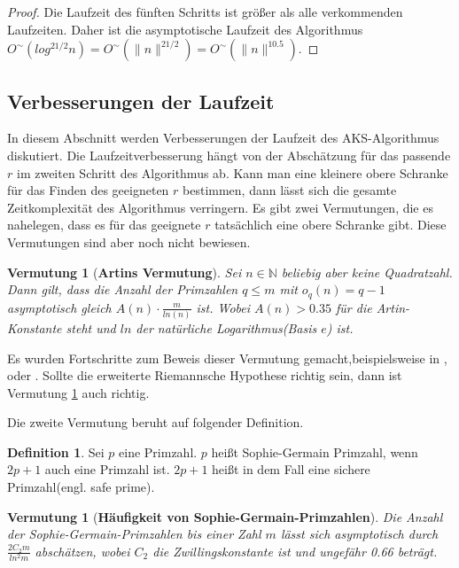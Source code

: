 \documentclass[12pt,oneside]{article}
\newtheorem{conj}[theorem]{Vermutung}
\theoremstyle{remark}
\theoremstyle{definition}
\newtheorem{definition}{Definition}[section]
\begin{document}
\begin{proof}
Die Laufzeit des fünften Schritts ist größer als alle verkommenden Laufzeiten. Daher ist die asymptotische Laufzeit des Algorithmus $O^{\sim}(log^{21/2}n) = O^{\sim}( \lVert n \rVert^{21/2}) = O^{\sim}(\lVert n \rVert^{10.5})$.\newline

\end{proof}

\subsection{Verbesserungen der Laufzeit}
In diesem Abschnitt werden Verbesserungen der Laufzeit des AKS-Algorithmus diskutiert. Die Laufzeitverbesserung hängt von der Abschätzung für das passende $r$ im zweiten Schritt des Algorithmus ab. Kann man eine kleinere obere Schranke für das Finden des geeigneten $r$ bestimmen, dann lässt sich die gesamte Zeitkomplexität des Algorithmus verringern. Es gibt zwei Vermutungen, die es nahelegen, dass es für das geeignete $r$ tatsächlich eine obere Schranke gibt. Diese Vermutungen sind aber noch nicht bewiesen.

\begin{conj}[\textbf{Artins Vermutung}]\label{artin_conj}
Sei $n \in \mathbb{N}$ beliebig aber keine Quadratzahl. Dann gilt, dass die Anzahl der Primzahlen $q \leq m$ mit $o_{q}(n) = q - 1$ asymptotisch gleich $A(n) \cdot \frac{m}{ln(n)}$ ist. Wobei $A(n) > 0.35$ für die Artin-Konstante steht und $ln$ der natürliche Logarithmus(Basis $e$) ist.
\end{conj}

Es wurden Fortschritte zum Beweis dieser Vermutung gemacht,beispielsweise in \cite{artin}, oder  \cite{artinSecond}. Sollte die erweiterte Riemannsche Hypothese richtig sein, dann ist Vermutung \ref{artin_conj} auch richtig.

Die zweite Vermutung beruht auf folgender Definition.
\begin{definition}
Sei $p$ eine Primzahl. $p$ heißt Sophie-Germain Primzahl, wenn $2p + 1$ auch eine Primzahl ist. $2p + 1$ heißt in dem Fall eine sichere Primzahl(engl. safe prime).
\end{definition}

\begin{conj}[\textbf{Häufigkeit von Sophie-Germain-Primzahlen}]\label{sophie-ger}
Die Anzahl der Sophie-Germain-Primzahlen bis einer Zahl $m$ lässt sich asymptotisch durch $\frac{2C_{2}m}{ln^2m}$ abschätzen, wobei $C_2$ die Zwillingskonstante ist und ungefähr 0.66 beträgt.
\end{conj}
\end{document}
